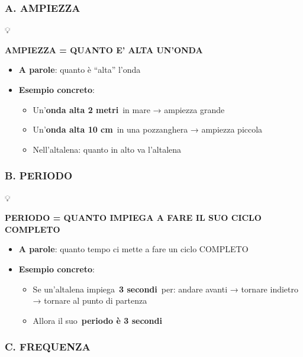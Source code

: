 \documentclass[
]{article}
\providecommand{\tightlist}{%
  \setlength{\itemsep}{0pt}\setlength{\parskip}{0pt}}
\begin{document}
\hypertarget{a.-ampiezza}{%
\subsubsection{\texorpdfstring{\textbf{A. AMPIEZZA}}{A. AMPIEZZA}}\label{a.-ampiezza}}

💡

\textbf{AMPIEZZA = QUANTO E' ALTA UN'ONDA}

\begin{itemize}
\tightlist
\item
  \textbf{A parole}: quanto è ``alta'' l'onda
\item
  \textbf{Esempio concreto}:

  \begin{itemize}
  \tightlist
  \item
    Un'\textbf{onda alta 2 metri}~in mare → ampiezza grande
  \item
    Un'\textbf{onda alta 10 cm}~in una pozzanghera → ampiezza piccola
  \item
    Nell'altalena: quanto in alto va l'altalena
  \end{itemize}
\end{itemize}

\hypertarget{b.-periodo}{%
\subsubsection{\texorpdfstring{\textbf{B. PERIODO}}{B. PERIODO}}\label{b.-periodo}}

💡

\textbf{PERIODO = QUANTO IMPIEGA A FARE IL SUO CICLO COMPLETO}

\begin{itemize}
\tightlist
\item
  \textbf{A parole}: quanto tempo ci mette a fare un ciclo COMPLETO
\item
  \textbf{Esempio concreto}:

  \begin{itemize}
  \tightlist
  \item
    Se un'altalena impiega~\textbf{3 secondi}~per: andare avanti → tornare indietro → tornare al punto di partenza
  \item
    Allora il suo~\textbf{periodo è 3 secondi}
  \end{itemize}
\end{itemize}

\hypertarget{c.-frequenza}{%
\subsubsection{\texorpdfstring{\textbf{C. FREQUENZA}}{C. FREQUENZA}}\label{c.-frequenza}}
\end{document}
